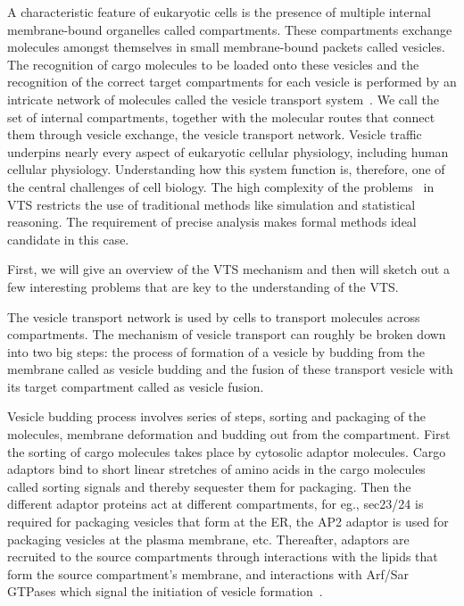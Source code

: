 A characteristic feature of eukaryotic cells is the presence of multiple internal membrane-bound organelles called compartments.
% 
These compartments exchange molecules amongst themselves in small membrane-bound packets called vesicles. 
%
The recognition of cargo molecules to be loaded onto these vesicles and the recognition of the correct target compartments for each vesicle is performed by an intricate network of molecules called the vesicle transport system~\cite{alberts2002molecular}. 
%
We call the set of internal compartments, together with the molecular routes that connect them through vesicle exchange, the vesicle transport network. 
%
Vesicle traffic underpins nearly every aspect of eukaryotic cellular physiology, including
human cellular physiology.
%
Understanding how this system function is, therefore,
one of the central challenges of cell biology.
%
The high complexity of the problems~\cite{mani2016wine, mani2016stacking} in VTS restricts the use of traditional methods like simulation and statistical reasoning. 
The requirement of precise analysis makes formal methods ideal candidate in this case. 

First, we will give an overview of the VTS mechanism and then will sketch out a few interesting problems that are key to the understanding of the VTS.

%
The vesicle transport network is used by cells to transport molecules across compartments.
% 
The mechanism of vesicle transport can roughly be broken down into two big steps:
%
the process of formation of a vesicle by budding from the membrane called as vesicle budding and the fusion of these transport vesicle with its target compartment called as vesicle fusion. 

Vesicle budding process involves series of steps, sorting and packaging of the molecules, membrane deformation and budding out from the compartment.
%
First the sorting of cargo molecules takes place by cytosolic adaptor molecules. 
%
Cargo adaptors bind to short linear stretches of amino acids in the cargo molecules called sorting signals and thereby sequester them for packaging. 
%
Then the different adaptor proteins act at different compartments, for eg., sec23/24 is required for packaging vesicles that form at the ER, the AP2 adaptor is used for packaging vesicles at the plasma membrane, etc.
%
Thereafter, adaptors are recruited to the source compartments through interactions with the lipids that form the source compartment's membrane, and interactions with Arf/Sar GTPases which signal the initiation of vesicle formation~\cite{paczkowski2015cargo}.

